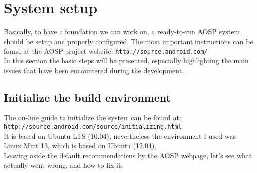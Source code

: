 \section{System setup}
\label{setup}
Basically, to have a foundation we can work on, a ready-to-run AOSP system should be setup and properly configured. The most important instructions can be found at the AOSP project website: \texttt{http://source.android.com/}\\
In this section the basic steps will be presented, especially highlighting the main issues that have been encountered during the development.\\
\subsection{Initialize the build environment}
The on-line guide to initialize the system can be found at:\\
\texttt{http://source.android.com/source/initializing.html}\\
It is based on Ubuntu LTS (10.04), nevertheless the environment I used was Linux Mint 13, which is based on Ubuntu (12.04).\\
Leaving aside the default recommendations by the AOSP webpage, let's see what actually went wrong, and how to fix it:
